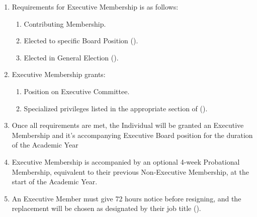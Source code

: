 \begin{enumerate}
	\item Requirements for Executive Membership is as follows:
		\begin{enumerate}
			\item Contributing Membership.

			\item Elected to specific Board Position ().

			\item Elected in General Election ().
		\end{enumerate}

	\item Executive Membership grants:
		\begin{enumerate}
			\item Position on Executive Committee.

			\item Specialized privileges listed in the appropriate section of ().
		\end{enumerate}

	\item Once all requirements are met, the Individual will be granted an
		Executive Membership and it's accompanying Executive Board position for the
		duration of the Academic Year

	\item Executive Membership is accompanied by an optional 4-week Probational Membership,
		equivalent to their previous Non-Executive Membership, at the start of the Academic
		Year.

	\item An Executive Member must give 72 hours notice before resigning, and the
		replacement will be chosen as designated by their job title ().
\end{enumerate}

